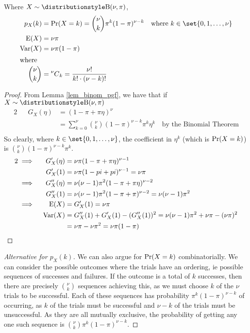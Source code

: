 \begin{theorem}
 Where \(X \sim \Binomial(\nu, \pi)\),
 \begin{align*}
  p_X(k) &= \Prob(X = k) = \binom \nu k \pi^k (1 - \pi)^{\nu - k}
      \quad \text{where \(k \in \set{0, 1, \dotsc, \nu}\)} \\
  \Expect(X) &= \nu \pi \\
  \Var(X) &= \nu \pi (1 - \pi) \\
  \intertext{where}
  \binom \nu k &= \nCr \nu k = \frac{\nu!}{k!\cdot (\nu - k)!}
 \end{align*}
\end{theorem}
\begin{proof}
 From Lemma \ref{lem_binom_pgf}, we have that if \(X \sim \Binomial(\nu, \pi)\)
 \begin{alignat*} 2
  && G_X(\eta) &= (1 - \pi + \pi \eta)^\nu \\
  &&           &= \sum_{k = 0}^\nu
                  \binom \nu k (1 - \pi)^{\nu - k} \pi^k \eta^k
                      \quad \text{by the Binomial Theorem} \\
 \end{alignat*}
  So clearly, where \(k \in \set{0, 1, \dotsc, \nu}\), the coefficient in
  \(\eta^k\) (which is \(\operatorname{Pr}(X = k)\)) is
  \(\binom \nu k (1 - \pi)^{\nu - k} \pi^k\).
  \begin{alignat*}2
  &\implies{}& G_X'(\eta) &= \nu \pi (1 - \pi + \pi \eta)^{\nu - 1} \\
  && G_X'(1) &= \nu \pi (1 - pi + pi)^{\nu - 1} = \nu \pi \\
  &\implies{}& G_X''(\eta)
      &= \nu(\nu - 1) \pi^2 (1 - \pi + \pi \eta)^{\nu - 2} \\
  && G_X''(1)
      &= \nu(\nu - 1)\pi^2(1 - \pi + \pi)^{\nu - 2} = \nu(\nu - 1)\pi^2 \\
  &\implies{}& \Expect(X) &= G_X'(1) = \nu \pi \\
  && \Var(X) &= G_X''(1) + G_X'(1) - (G_X''(1))^2
      = \nu(\nu - 1) \pi^2 + \nu \pi - (\nu \pi)^2 \\
  && &= \nu \pi - \nu \pi^2 = \nu \pi (1 - \pi) \qedhere
 \end{alignat*}
\end{proof}
\begin{proof}[Alternative for \(p_X(k)\)]
 We can also argue for \(\operatorname{Pr}(X = k)\) combinatorially. We can consider the
 possible outcomes where the trials have an ordering, ie possible sequences of
 successes and failures. If the outcome is a total of \(k\) successes, then
 there are precisely \(\binom \nu k\) sequences achieving this, as we must
 choose \(k\) of the \(\nu\) trials to be successful. Each of these sequences
 has probability \(\pi^k (1 - \pi)^{\nu - k}\) of occurring, as \(k\) of the
 trials must be successful and \(\nu - k\) of the trials must be unsuccessful.
 As they are all mutually exclusive, the probability of getting any one such
 sequence is \(\binom \nu k \pi^k (1 - \pi)^{\nu - k}\).
\end{proof}
